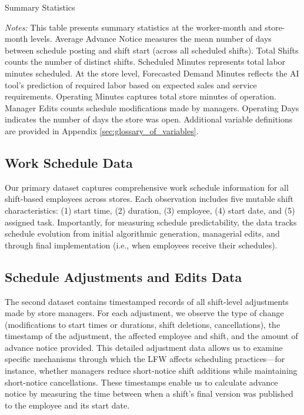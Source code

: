 \documentclass[letterpaper,11pt,leqno]{article}
\theoremstyle{paper}
\newcommand{\note}[2][]{\parbox{\textwidth}{\footnotesize\vspace*{10pt}\textit{#1}#2}}
\begin{document}
\begin{singlespace}
\begin{table}[h]
\caption{Summary Statistics}

\note{\textit{Notes:} \scriptsize This table presents summary statistics at the worker-month and store-month levels. Average Advance Notice measures the mean number of days between schedule posting and shift start (across all scheduled shifts). Total Shifts counts the number of distinct shifts. Scheduled Minutes represents total labor minutes scheduled. At the store level, Forecasted Demand Minutes reflects the AI tool's prediction of required labor based on expected sales and service requirements. Operating Minutes captures total store minutes of operation. Manager Edits counts schedule modifications made by managers. Operating Days indicates the number of days the store was open. Additional variable definitions are provided in Appendix \ref{sec:glossary_of_variables}.}
\label{table:sum_stats_all}
\end{table}
\end{singlespace}


\subsection{Work Schedule Data} \label{subsec:data_versions}
Our primary dataset captures comprehensive work schedule information for all shift-based employees across stores. Each observation includes five mutable shift characteristics: (1) start time, (2) duration, (3) employee, (4) start date, and (5) assigned task. Importantly, for measuring schedule predictability, the data tracks schedule evolution from initial algorithmic generation, managerial edits, and through final implementation (i.e., when employees receive their schedules). 

\subsection{Schedule Adjustments and Edits Data} \label{subsec:data_adjustments}
The second dataset contains timestamped records of all shift-level adjustments made by store managers. For each adjustment, we observe the type of change (modifications to start times or durations, shift deletions, cancellations), the timestamp of the adjustment, the affected employee and shift, and the amount of advance notice provided. This detailed adjustment data allows us to examine specific mechanisms through which the LFW affects scheduling practices—for instance, whether managers reduce short-notice shift additions while maintaining short-notice cancellations. These timestamps enable us to calculate advance notice by measuring the time between when a shift's final version was published to the employee and its start date.
\end{document}
